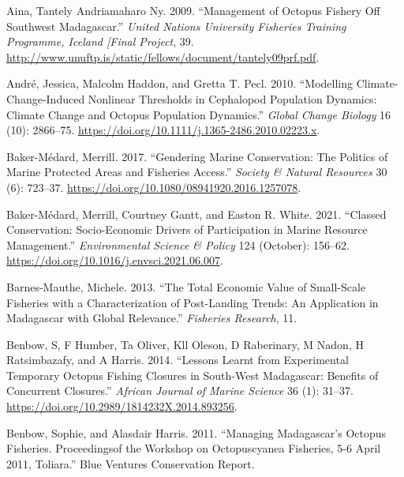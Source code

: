 \documentclass[
]{article}
\newlength{\cslhangindent}
\newlength{\cslentryspacingunit} %
\newenvironment{CSLReferences}[2] %
 {%
  \setlength{\parindent}{0pt}
  \ifodd #1
  \let\oldpar\par
  \def\par{\hangindent=\cslhangindent\oldpar}
  \fi
  \setlength{\parskip}{#2\cslentryspacingunit}
 }%
 {}
\begin{document}
\hypertarget{refs}{}
\begin{CSLReferences}{1}{0}
\leavevmode{}%
Aina, Tantely Andriamaharo Ny. 2009. {``Management of Octopus Fishery Off {Southwest} {Madagascar}.''} \emph{United Nations University Fisheries Training Programme, Iceland {[}Final Project}, 39. \url{http://www.unuftp.is/static/fellows/document/tantely09prf.pdf}.

\leavevmode{}%
André, Jessica, Malcolm Haddon, and Gretta T. Pecl. 2010. {``Modelling Climate-Change-Induced Nonlinear Thresholds in Cephalopod Population Dynamics: {Climate} Change and Octopus Population Dynamics.''} \emph{Global Change Biology} 16 (10): 2866--75. \url{https://doi.org/10.1111/j.1365-2486.2010.02223.x}.

\leavevmode{}%
Baker-Médard, Merrill. 2017. {``Gendering {Marine} {Conservation}: {The} {Politics} of {Marine} {Protected} {Areas} and {Fisheries} {Access}.''} \emph{Society \& Natural Resources} 30 (6): 723--37. \url{https://doi.org/10.1080/08941920.2016.1257078}.

\leavevmode{}%
Baker-Médard, Merrill, Courtney Gantt, and Easton R. White. 2021. {``Classed Conservation: {Socio}-Economic Drivers of Participation in Marine Resource Management.''} \emph{Environmental Science \& Policy} 124 (October): 156--62. \url{https://doi.org/10.1016/j.envsci.2021.06.007}.

\leavevmode{}%
Barnes-Mauthe, Michele. 2013. {``The Total Economic Value of Small-Scale Fisheries with a Characterization of Post-Landing Trends: {An} Application in {Madagascar} with Global Relevance.''} \emph{Fisheries Research}, 11.

\leavevmode{}%
Benbow, S, F Humber, Ta Oliver, Kll Oleson, D Raberinary, M Nadon, H Ratsimbazafy, and A Harris. 2014. {``Lessons Learnt from Experimental Temporary Octopus Fishing Closures in South-West {Madagascar}: Benefits of Concurrent Closures.''} \emph{African Journal of Marine Science} 36 (1): 31--37. \url{https://doi.org/10.2989/1814232X.2014.893256}.

\leavevmode{}%
Benbow, Sophie, and Alasdair Harris. 2011. {``Managing {Madagascar}'s Octopus Fisheries. {Proceedingsof} the Workshop on {Octopuscyanea} Fisheries, 5-6 {April} 2011, {Toliara}.''} Blue Ventures Conservation Report.


\end{CSLReferences}
\end{document}
